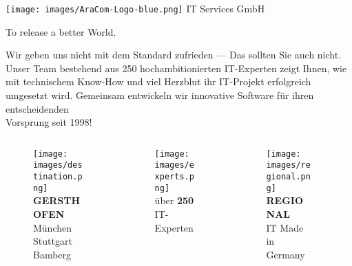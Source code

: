 \documentclass[aspectratio=169]{beamer}
\begin{document}
\begin{frame}{\texttt{[image: images/AraCom-Logo-blue.png]} IT Services GmbH}

  {\LARGE To release a better World.}

  {\normalsize
    Wir geben uns nicht mit dem Standard zufrieden --- Das sollten Sie auch nicht.\\
    Unser Team bestehend aus 250 hochambitionierten IT-Experten zeigt Ihnen, wie mit technischem Know-How und viel Herzblut ihr IT-Projekt erfolgreich umgesetzt wird. Gemeinsam entwickeln wir innovative Software für ihren entscheidenden \\
    Vorsprung seit 1998!
  }

  {\footnotesize
    \begin{columns}
      \begin{column}{0.20\textwidth}
        \begin{figure}
          \centering
          \texttt{[image: images/destination.png]}\\
          \textbf{GERSTHOFEN}\\
          München \\
          Stuttgart\\
          Bamberg
        \end{figure}
      \end{column}
      \begin{column}{0.20\textwidth}
        \begin{figure}
          \centering
          \texttt{[image: images/experts.png]}\\
          über \textbf{250}\\ IT-Experten%
          \newline\newline
        \end{figure}
      \end{column}
      \begin{column}{0.20\textwidth}
        \begin{figure}
          \centering
          \texttt{[image: images/regional.png]}\\
          \textbf{REGIONAL}\\ IT Made in Germany\newline
        \end{figure}
      \end{column}
      \begin{column}{0.20\textwidth}

\end{column}
\end{columns}}
\end{frame}
\end{document}
